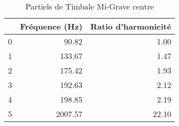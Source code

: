 \begin{table}
\centering
\caption{Partiels de Timbale Mi-Grave centre}
\label{table:partiels-timbale-migrave-4.wav}
\begin{tabular}{lrr}
\toprule
{} &  Fréquence (Hz) &  Ratio d'harmonicité \\
\midrule
0 &           90.82 &                 1.00 \\
1 &          133.67 &                 1.47 \\
2 &          175.42 &                 1.93 \\
3 &          192.63 &                 2.12 \\
4 &          198.85 &                 2.19 \\
5 &         2007.57 &                22.10 \\
\bottomrule
\end{tabular}
\end{table}
